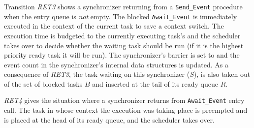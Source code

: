 
Transition \emph{RET3} shows a synchronizer returning from a
\texttt{Send\_Event} procedure when the entry queue is \emph{not}
empty. The blocked \texttt{Await\_Event} is immediately executed in
the context of the current task to save a context switch. The
execution time is budgeted to the currently executing task's 
and the scheduler takes over to decide whether the waiting task should
be run (if it is the highest priority ready task it will be run). The
synchronizer's barrier is set to  and the event count in the
synchronizer's internal data structures is updated. As a consequence
of \emph{RET3}, the task waiting on this synchronizer ($S$), is also
taken out of the set of blocked tasks $B$ and inserted at the tail of
its ready queue $R$.


\emph{RET4} gives the situation where a synchronizer returns from
\texttt{Await\_Event} entry call. The task in whose context the
execution was taking place is preempted and is placed at the head of
its ready queue, and the scheduler takes over.

